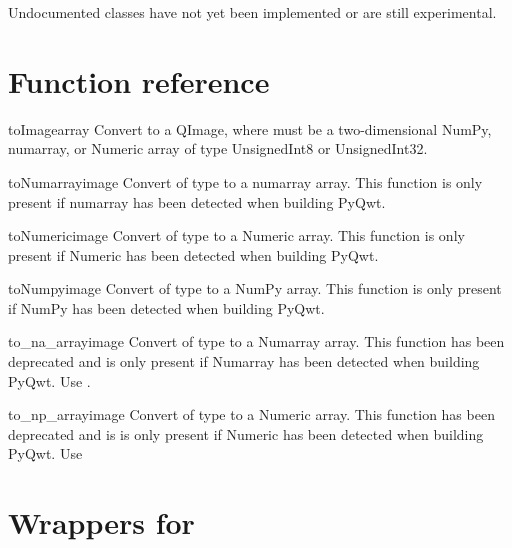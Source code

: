 \documentclass{manual}
\newcommand{\PyQwtLatestTarGz}{\ulink{PyQwt-5.0.1.tar.gz}
  {http://prdownloads.sourceforge.net/pyqwt/PyQwt-5.0.1.tar.gz?download}}
\newcommand{\Future}{
  \begin{notice}[warning]
    The documentation is for PyQwt-5.0.1 which has not yet been released. The
    latest release is \PyQwtLatestTarGz{} and refer to the documentation
    included in the latest release when using it.
  \end{notice}
}
\renewcommand{\Future}{}
\begin{document}
Undocumented classes have not yet been implemented or are still experimental.


\section{Function reference\label{functions}}

\Future{}

\begin{funcdesc}{toImage}{array}
  Convert  to a QImage, where  must be a two-dimensional
  NumPy, numarray, or Numeric array of type UnsignedInt8 or UnsignedInt32.
\end{funcdesc}

\begin{funcdesc}{toNumarray}{image}
  Convert  of type  to a numarray array. This function
  is only present if numarray has been detected when building PyQwt.
\end{funcdesc}

\begin{funcdesc}{toNumeric}{image}
  Convert  of type  to a Numeric array. This function
  is only present if Numeric has been detected when building PyQwt.
\end{funcdesc}

\begin{funcdesc}{toNumpy}{image}
  Convert  of type  to a NumPy array. This function
  is only present if NumPy has been detected when building PyQwt.
\end{funcdesc}

\begin{funcdesc}{to_na_array}{image}
  Convert  of type  to a Numarray array. This function
  has been deprecated and is only present if Numarray has been detected when
  building PyQwt.  Use .
\end{funcdesc}

\begin{funcdesc}{to_np_array}{image}
  Convert  of type  to a Numeric array. This function
  has been deprecated and is is only present if Numeric has been detected when
  building PyQwt. Use 
\end{funcdesc}



\section{Wrappers for  \label{qwtarray}}
\end{document}
